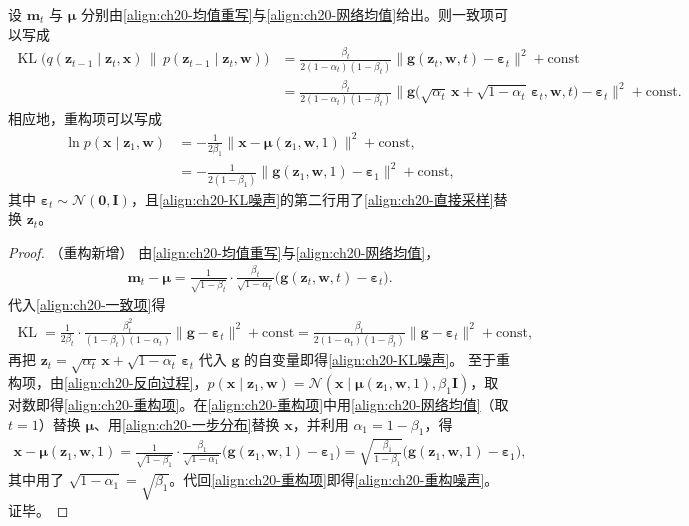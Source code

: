 \documentclass[../../main.tex]{subfiles}
\begin{document}
\begin{proposition}[噪声预测损失]\label{proposition:ch20-噪声预测损失}
设 $\bm{m}_t$ 与 $\bm{\mu}$ 分别由\eqref{align:ch20-均值重写}与\eqref{align:ch20-网络均值}给出。则一致项可以写成
\begin{align}
\operatorname{KL}\big(q(\bm{z}_{t-1}\mid\bm{z}_t,\bm{x})\,\|\,p(\bm{z}_{t-1}\mid\bm{z}_t,\bm{w})\big)&=\frac{\beta_t}{2(1-\alpha_t)(1-\beta_t)}\big\|\bm{g}(\bm{z}_t,\bm{w},t)-\bm{\varepsilon}_t\big\|^2+\mathrm{const}\nonumber\\
&=\frac{\beta_t}{2(1-\alpha_t)(1-\beta_t)}\big\|\bm{g}\big(\sqrt{\alpha_t}\,\bm{x}+\sqrt{1-\alpha_t}\,\bm{\varepsilon}_t,\bm{w},t\big)-\bm{\varepsilon}_t\big\|^2+\mathrm{const}.
\label{align:ch20-KL噪声}
\end{align}
相应地，重构项可以写成
\begin{align}
\ln p(\bm{x}\mid\bm{z}_1,\bm{w})&=-\frac{1}{2\beta_1}\big\|\bm{x}-\bm{\mu}(\bm{z}_1,\bm{w},1)\big\|^2+\mathrm{const},
\label{align:ch20-重构项}\\
&=-\frac{1}{2(1-\beta_1)}\big\|\bm{g}(\bm{z}_1,\bm{w},1)-\bm{\varepsilon}_1\big\|^2+\mathrm{const},
\label{align:ch20-重构噪声}
\end{align}
其中 $\bm{\varepsilon}_t\sim\mathcal{N}(\bm{0},\bm{I})$，且\eqref{align:ch20-KL噪声}的第二行用了\eqref{align:ch20-直接采样}替换 $\bm{z}_t$。
\end{proposition}

\begin{proof}（重构新增）
由\eqref{align:ch20-均值重写}与\eqref{align:ch20-网络均值}，
\begin{align*}
\bm{m}_t-\bm{\mu}=\frac{1}{\sqrt{1-\beta_t}}\cdot\frac{\beta_t}{\sqrt{1-\alpha_t}}\big(\bm{g}(\bm{z}_t,\bm{w},t)-\bm{\varepsilon}_t\big).
\end{align*}
代入\eqref{align:ch20-一致项}得
\begin{align*}
\operatorname{KL}=\frac{1}{2\beta_t}\cdot\frac{\beta_t^2}{(1-\beta_t)(1-\alpha_t)}\|\bm{g}-\bm{\varepsilon}_t\|^2+\mathrm{const}=\frac{\beta_t}{2(1-\alpha_t)(1-\beta_t)}\|\bm{g}-\bm{\varepsilon}_t\|^2+\mathrm{const},
\end{align*}
再把 $\bm{z}_t=\sqrt{\alpha_t}\,\bm{x}+\sqrt{1-\alpha_t}\,\bm{\varepsilon}_t$ 代入 $\bm{g}$ 的自变量即得\eqref{align:ch20-KL噪声}。
至于重构项，由\eqref{align:ch20-反向过程}，$p(\bm{x}\mid\bm{z}_1,\bm{w})=\mathcal{N}(\bm{x}\mid\bm{\mu}(\bm{z}_1,\bm{w},1),\beta_1\bm{I})$，取对数即得\eqref{align:ch20-重构项}。在\eqref{align:ch20-重构项}中用\eqref{align:ch20-网络均值}（取 $t=1$）替换 $\bm{\mu}$、用\eqref{align:ch20-一步分布}替换 $\bm{x}$，并利用 $\alpha_1=1-\beta_1$，得
\begin{align*}
\bm{x}-\bm{\mu}(\bm{z}_1,\bm{w},1)=\frac{1}{\sqrt{1-\beta_1}}\cdot\frac{\beta_1}{\sqrt{1-\alpha_1}}\big(\bm{g}(\bm{z}_1,\bm{w},1)-\bm{\varepsilon}_1\big)=\sqrt{\frac{\beta_1}{1-\beta_1}}\big(\bm{g}(\bm{z}_1,\bm{w},1)-\bm{\varepsilon}_1\big),
\end{align*}
其中用了 $\sqrt{1-\alpha_1}=\sqrt{\beta_1}$。代回\eqref{align:ch20-重构项}即得\eqref{align:ch20-重构噪声}。证毕。
\end{proof}
\end{document}
